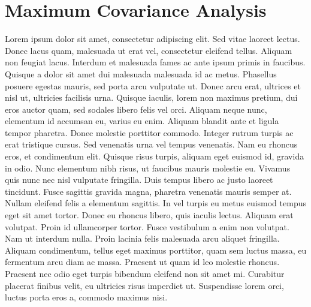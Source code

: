\section{Maximum Covariance Analysis}
Lorem ipsum dolor sit amet, consectetur adipiscing elit. Sed vitae laoreet lectus. Donec lacus quam, malesuada ut erat vel, consectetur eleifend tellus. Aliquam non feugiat lacus. Interdum et malesuada fames ac ante ipsum primis in faucibus. Quisque a dolor sit amet dui malesuada malesuada id ac metus. Phasellus posuere egestas mauris, sed porta arcu vulputate ut. Donec arcu erat, ultrices et nisl ut, ultricies facilisis urna. Quisque iaculis, lorem non maximus pretium, dui eros auctor quam, sed sodales libero felis vel orci. Aliquam neque nunc, elementum id accumsan eu, varius eu enim. Aliquam blandit ante et ligula tempor pharetra. Donec molestie porttitor commodo. Integer rutrum turpis ac erat tristique cursus. Sed venenatis urna vel tempus venenatis. Nam eu rhoncus eros, et condimentum elit. Quisque risus turpis, aliquam eget euismod id, gravida in odio. Nunc elementum nibh risus, ut faucibus mauris molestie eu.
 Vivamus quis nunc nec nisl vulputate fringilla. Duis tempus libero ac justo laoreet tincidunt. Fusce sagittis gravida magna, pharetra venenatis mauris semper at. Nullam eleifend felis a elementum sagittis. In vel turpis eu metus euismod tempus eget sit amet tortor. Donec eu rhoncus libero, quis iaculis lectus. Aliquam erat volutpat. Proin id ullamcorper tortor. Fusce vestibulum a enim non volutpat. Nam ut interdum nulla. Proin lacinia felis malesuada arcu aliquet fringilla. Aliquam condimentum, tellus eget maximus porttitor, quam sem luctus massa, eu fermentum arcu diam ac massa. Praesent ut quam id leo molestie rhoncus. Praesent nec odio eget turpis bibendum eleifend non sit amet mi. Curabitur placerat finibus velit, eu ultricies risus imperdiet ut. Suspendisse lorem orci, luctus porta eros a, commodo maximus nisi.


